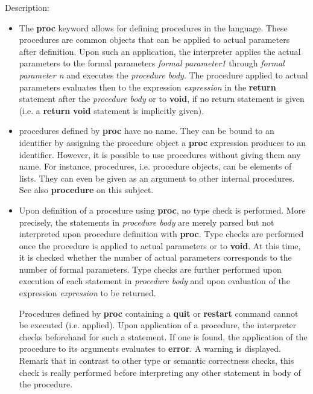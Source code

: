 \noindent Description: \begin{itemize}

\item The \textbf{proc} keyword allows for defining procedures in the \sollya
   language. These procedures are common \sollya objects that can be
   applied to actual parameters after definition. Upon such an
   application, the \sollya interpreter applies the actual parameters to
   the formal parameters \emph{formal parameter1} through \emph{formal parameter n}
   and executes the \emph{procedure body}. The procedure applied to actual
   parameters evaluates then to the expression \emph{expression} in the
   \textbf{return} statement after the \emph{procedure body} or to \textbf{void}, if no return
   statement is given (i.e. a \textbf{return} \textbf{void} statement is implicitly
   given).

\item \sollya procedures defined by \textbf{proc} have no name. They can be bound
   to an identifier by assigning the procedure object a \textbf{proc}
   expression produces to an identifier. However, it is possible to use
   procedures without giving them any name. For instance, \sollya
   procedures, i.e. procedure objects, can be elements of lists. They can
   even be given as an argument to other internal \sollya procedures. See
   also \textbf{procedure} on this subject.

\item Upon definition of a \sollya procedure using \textbf{proc}, no type check
   is performed. More precisely, the statements in \emph{procedure body} are
   merely parsed but not interpreted upon procedure definition with
   \textbf{proc}. Type checks are performed once the procedure is applied to
   actual parameters or to \textbf{void}. At this time, it is checked whether the
   number of actual parameters corresponds to the number of formal
   parameters. Type checks are further performed upon execution of each
   statement in \emph{procedure body} and upon evaluation of the expression
   \emph{expression} to be returned.
    
   Procedures defined by \textbf{proc} containing a \textbf{quit} or \textbf{restart} command
   cannot be executed (i.e. applied). Upon application of a procedure,
   the \sollya interpreter checks beforehand for such a statement. If one
   is found, the application of the procedure to its arguments evaluates
   to \textbf{error}. A warning is displayed. Remark that in contrast to other
   type or semantic correctness checks, this check is really performed
   before interpreting any other statement in body of the procedure.


\end{itemize}
